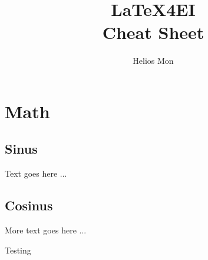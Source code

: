 \documentclass[german]{latex4ei/latex4ei_sheet}
\title{LaTeX4EI \\ Cheat Sheet}
\author{Helios Mon}                    %
\begin{document}
\maketitle   %


\section{Math}


\begin{sectionbox}
    \subsection{Sinus}

    Text goes here ...


\end{sectionbox}


\begin{sectionbox}
    \subsection{Cosinus}

    More text goes here ...

\end{sectionbox}

\begin{sectionbox}
    Testing
\end{sectionbox}

\end{document}
